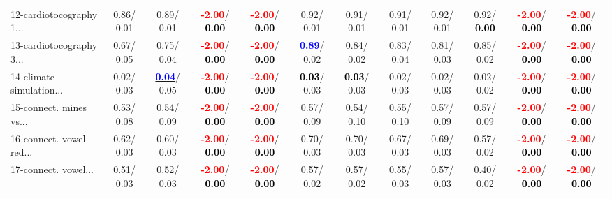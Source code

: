 \begin{table}[h]
\begin{center}
{\begin{tabular}{lc|c|c|c|c|c|c|c|c|c|c}
12-cardiotocography 1... &   0.86/  0.01 &   0.89/  0.01 & \textcolor{red}{\textbf{ -2.00}}/\textcolor{black}{\textbf{  0.00}} & \textcolor{red}{\textbf{ -2.00}}/\textcolor{black}{\textbf{  0.00}} &   0.92/  0.01 &   0.91/  0.01 &   0.91/  0.01 &   0.92/  0.01 &   0.92/\textcolor{black}{\textbf{  0.00}} & \textcolor{red}{\textbf{ -2.00}}/\textcolor{black}{\textbf{  0.00}} & \textcolor{red}{\textbf{ -2.00}}/\textcolor{black}{\textbf{  0.00}} \\
13-cardiotocography 3... &   0.67/  0.05 &   0.75/  0.04 & \textcolor{red}{\textbf{ -2.00}}/\textcolor{black}{\textbf{  0.00}} & \textcolor{red}{\textbf{ -2.00}}/\textcolor{black}{\textbf{  0.00}} & \underline{\textcolor{blue}{\textbf{  0.89}}}/  0.02 &   0.84/  0.02 &   0.83/  0.04 &   0.81/  0.03 &   0.85/  0.02 & \textcolor{red}{\textbf{ -2.00}}/\textcolor{black}{\textbf{  0.00}} & \textcolor{red}{\textbf{ -2.00}}/\textcolor{black}{\textbf{  0.00}} \\
14-climate simulation... &   0.02/  0.03 & \underline{\textcolor{blue}{\textbf{  0.04}}}/  0.05 & \textcolor{red}{\textbf{ -2.00}}/\textcolor{black}{\textbf{  0.00}} & \textcolor{red}{\textbf{ -2.00}}/\textcolor{black}{\textbf{  0.00}} & \textcolor{black}{\textbf{  0.03}}/  0.03 & \textcolor{black}{\textbf{  0.03}}/  0.03 &   0.02/  0.03 &   0.02/  0.03 &   0.02/  0.02 & \textcolor{red}{\textbf{ -2.00}}/\textcolor{black}{\textbf{  0.00}} & \textcolor{red}{\textbf{ -2.00}}/\textcolor{black}{\textbf{  0.00}} \\ \hline
15-connect. mines vs... &   0.53/  0.08 &   0.54/  0.09 & \textcolor{red}{\textbf{ -2.00}}/\textcolor{black}{\textbf{  0.00}} & \textcolor{red}{\textbf{ -2.00}}/\textcolor{black}{\textbf{  0.00}} &   0.57/  0.09 &   0.54/  0.10 &   0.55/  0.10 &   0.57/  0.09 &   0.57/  0.09 & \textcolor{red}{\textbf{ -2.00}}/\textcolor{black}{\textbf{  0.00}} & \textcolor{red}{\textbf{ -2.00}}/\textcolor{black}{\textbf{  0.00}} \\
16-connect. vowel red... &   0.62/  0.03 &   0.60/  0.03 & \textcolor{red}{\textbf{ -2.00}}/\textcolor{black}{\textbf{  0.00}} & \textcolor{red}{\textbf{ -2.00}}/\textcolor{black}{\textbf{  0.00}} &   0.70/  0.03 &   0.70/  0.03 &   0.67/  0.03 &   0.69/  0.03 &   0.57/  0.02 & \textcolor{red}{\textbf{ -2.00}}/\textcolor{black}{\textbf{  0.00}} & \textcolor{red}{\textbf{ -2.00}}/\textcolor{black}{\textbf{  0.00}} \\
17-connect. vowel... &   0.51/  0.03 &   0.52/  0.03 & \textcolor{red}{\textbf{ -2.00}}/\textcolor{black}{\textbf{  0.00}} & \textcolor{red}{\textbf{ -2.00}}/\textcolor{black}{\textbf{  0.00}} &   0.57/  0.02 &   0.57/  0.02 &   0.55/  0.03 &   0.57/  0.03 &   0.40/  0.02 & \textcolor{red}{\textbf{ -2.00}}/\textcolor{black}{\textbf{  0.00}} & \textcolor{red}{\textbf{ -2.00}}/\textcolor{black}{\textbf{  0.00}} \\

\end{tabular}}
\end{center}
\end{table}
